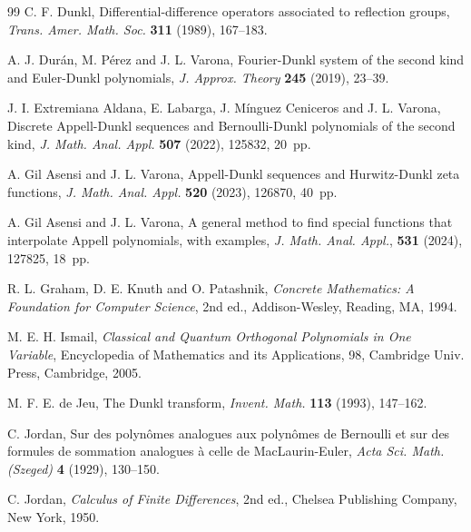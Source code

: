 \documentclass[11pt]{article}
\theoremstyle{plain}
\theoremstyle{remark}
\numberwithin{equation}{section} %
\begin{document}
\begin{thebibliography}{99}
C. F. Dunkl,
{Differential-difference operators associated to reflection groups},
\textit{Trans. Amer. Math. Soc.}
\textbf{311} (1989), 167--183.

A. J. Dur\'an, M. P\'erez and J. L. Varona,
Fourier-Dunkl system of the second kind and Euler-Dunkl polynomials,
\textit{J. Approx. Theory}
\textbf{245} (2019), 23--39.


J. I. Extremiana Aldana, E. Labarga, J. M\'inguez Ceniceros and J. L. Varona,
{Discrete Appell-Dunkl sequences and Bernoulli-Dunkl polynomials of the second kind},
\textit{J. Math. Anal. Appl.} \textbf{507} (2022), 125832, 20~pp. 

A. Gil Asensi and J. L. Varona, 
{Appell-Dunkl sequences and Hurwitz-Dunkl zeta functions}, 
\textit{J. Math. Anal. Appl.} 
\textbf{520} (2023), 126870, 40~pp. 

A. Gil Asensi and J. L. Varona, 
{A general method to find special functions that interpolate Appell polynomials, 
with examples}, 
\textit{J. Math. Anal. Appl.},
\textbf{531} (2024), 127825, 18~pp. 


R. L. Graham, D. E. Knuth and O. Patashnik,
\textit{Concrete Mathematics: A Foundation for Computer Science}, 2nd ed.,
Addison-Wesley, Reading, MA, 1994.

M. E. H. Ismail,
\textit{Classical and Quantum Orthogonal Polynomials in One Variable},
Encyclopedia of Mathematics and its Applications, 98,
Cambridge Univ. Press,
Cambridge, 2005.

M. F. E. de Jeu,
{The Dunkl transform},
\textit{Invent. Math.}
\textbf{113} (1993), 147--162.

C. Jordan,
Sur des polyn\^omes analogues aux polyn\^omes de Bernoulli et sur des formules de sommation analogues \`a celle de MacLaurin-Euler,
\textit{Acta Sci. Math. (Szeged)}
\textbf{4} (1929), 130--150.

C. Jordan,
\textit{Calculus of Finite Differences},
2nd ed., Chelsea Publishing Company, New York, 1950. 


\end{thebibliography}
\end{document}
